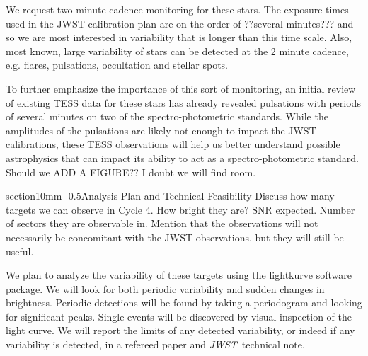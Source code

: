 \documentclass[letterpaper,12pt]{article}
\makeatletter
\renewcommand{\section}{\@startsection%
{section}{1}{0mm}{-\baselineskip}%
{0.5\baselineskip}{\normalfont\Large\bfseries}}%
\newcommand{\tess}{{\it TESS}}
\newcommand{\jwst}{{\it JWST}}
\makeatother
\begin{document}
We request two-minute cadence monitoring for these stars.  The exposure times used in the JWST calibration plan are on the order of ??several minutes??? and so we are most interested in variability that is longer than this time scale.  Also, most known, large variability of stars can be detected at the 2 minute cadence, e.g. flares, pulsations, occultation and stellar spots. 

To further emphasize the importance of this sort of monitoring, an initial review of existing TESS data for these stars has already revealed pulsations with periods of several minutes on two of the spectro-photometric standards. While the amplitudes of the pulsations are likely not enough to impact the JWST calibrations, these TESS observations will help us better understand possible astrophysics that can impact its ability to act as a spectro-photometric standard.
Should we ADD A FIGURE?? I doubt we will find room.





\section{Analysis Plan and Technical Feasibility}
Discuss how many targets we can observe in Cycle 4. How bright they are? SNR expected. Number of sectors they are observable in.
Mention that the observations will not necessarily be concomitant with the JWST observations, but they will still be useful. 

We plan to analyze the variability of these targets using the lightkurve software package. We will look for both periodic variability and sudden changes in brightness. Periodic detections will be found by taking a periodogram and looking for significant peaks. Single events will be discovered by visual inspection of the light curve. We will report the limits of any detected variability, or indeed if any variability is detected, in a refereed paper and \jwst\ technical note.


\end{document}
